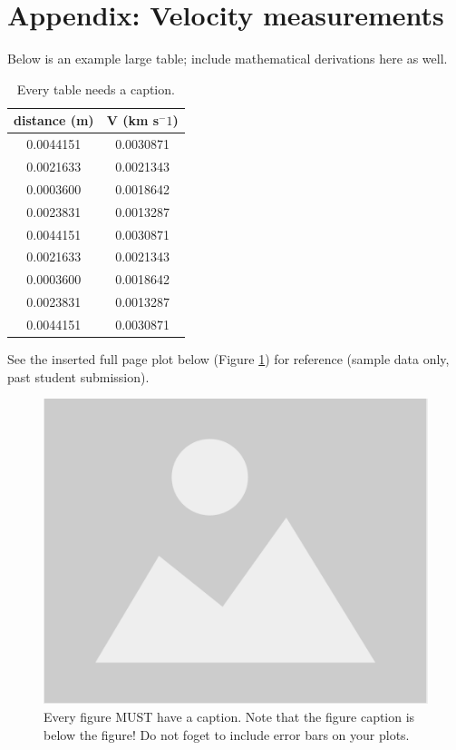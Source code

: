 \documentclass[letterpaper,11pt]{article}
\begin{document}
\appendix

\section*{Appendix: Velocity measurements}

Below is an example large table; include mathematical derivations here as well.
\begin{table}[ht]
\begin{center}
\caption{Every table needs a caption.}
\label{table2}
\begin{tabular}{cc}
\hline
\multicolumn{1}{c}{distance (m)} & \multicolumn{1}{c}{V (km s$^-1$)} \\
\hline
0.0044151 &   0.0030871 \\
0.0021633 &   0.0021343 \\
0.0003600 &   0.0018642 \\
0.0023831 &   0.0013287 \\
0.0044151 &   0.0030871 \\
0.0021633 &   0.0021343 \\
0.0003600 &   0.0018642 \\
0.0023831 &   0.0013287 \\
0.0044151 &   0.0030871 \\
\hline
\end{tabular}
\end{center}
\end{table}

See the inserted full page plot below (Figure \ref{fig2}) for reference (sample data only, past student submission).

\begin{figure}[ht]
        \centering \includegraphics[width=.9\columnwidth]{placeholder-image}
        \caption{\label{fig2}Every figure MUST have a caption. Note that the figure caption is below the figure! Do not foget to include error bars on your plots.
        }
\end{figure}
\end{document}

